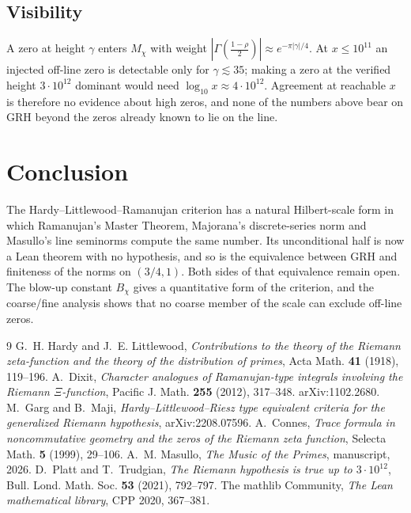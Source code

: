 \documentclass[11pt]{amsart}
\theoremstyle{definition}
\theoremstyle{remark}
\begin{document}
\subsection*{Visibility}
A zero at height $\gamma$ enters $M_\chi$ with weight $|\Gamma(\frac{1-\rho}2)|\approx e^{-\pi|\gamma|/4}$. At
$x\le10^{11}$ an injected off-line zero is detectable only for $\gamma\lesssim35$; making a zero at the verified height
$3\cdot10^{12}$ \cite{PT} dominant would need $\log_{10}x\approx4\cdot10^{12}$. Agreement at reachable $x$ is therefore no evidence
about high zeros, and none of the numbers above bear on GRH beyond the zeros already known to lie on the line.

\section{Conclusion}
The Hardy--Littlewood--Ramanujan criterion has a natural Hilbert-scale form in which Ramanujan's Master Theorem,
Majorana's discrete-series norm and Masullo's line seminorms compute the same number. Its unconditional half is now a
Lean theorem with no hypothesis, and so is the equivalence between GRH and finiteness of the norms on $(3/4,1)$.
Both sides of that equivalence remain open. The blow-up constant $B_\chi$ gives a quantitative form of the criterion, and the coarse/fine analysis shows
that no coarse member of the scale can exclude off-line zeros.

\begin{thebibliography}{9}
 G.~H. Hardy and J.~E. Littlewood, \emph{Contributions to the theory of the Riemann zeta-function and the
theory of the distribution of primes}, Acta Math. \textbf{41} (1918), 119--196.
 A.~Dixit, \emph{Character analogues of Ramanujan-type integrals involving the Riemann $\Xi$-function},
Pacific J. Math. \textbf{255} (2012), 317--348. arXiv:1102.2680.
 M.~Garg and B.~Maji, \emph{Hardy--Littlewood--Riesz type equivalent criteria for the generalized Riemann
hypothesis}, arXiv:2208.07596.
 A.~Connes, \emph{Trace formula in noncommutative geometry and the zeros of the Riemann zeta function},
Selecta Math. \textbf{5} (1999), 29--106.
 A.~M. Masullo, \emph{The Music of the Primes}, manuscript, 2026.
 D.~Platt and T.~Trudgian, \emph{The Riemann hypothesis is true up to $3\cdot10^{12}$}, Bull. Lond. Math.
Soc. \textbf{53} (2021), 792--797.
 The mathlib Community, \emph{The Lean mathematical library}, CPP 2020, 367--381.
\end{thebibliography}
\end{document}
